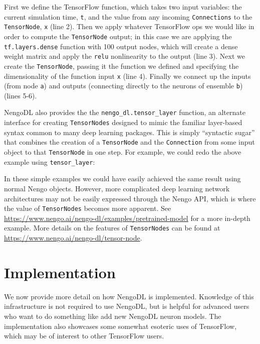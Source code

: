 \documentclass{article}
\begin{document}


First we define the TensorFlow function, which takes two input variables: the current simulation time, \texttt{t}, and the value from any incoming \texttt{Connections} to the \texttt{TensorNode}, \texttt{x} (line 2).  Then we apply whatever TensorFlow ops we would like in order to compute the \texttt{TensorNode} output; in this case we are applying the \texttt{tf.layers.dense} function with 100 output nodes, which will create a dense weight matrix and apply the \texttt{relu} nonlinearity to the output (line 3).  Next we create the \texttt{TensorNode}, passing it the function we defined and specifying the dimensionality of the function input \texttt{x} (line 4).  Finally we connect up the inputs (from node \texttt{a}) and outputs (connecting directly to the neurons of ensemble \texttt{b}) (lines 5-6).

NengoDL also provides the the \texttt{nengo\_dl.tensor\_layer} function, an alternate interface for creating \texttt{TensorNodes} designed to mimic the familiar layer-based syntax common to many deep learning packages.  This is simply ``syntactic sugar'' that combines the creation of a \texttt{TensorNode} and the \texttt{Connection} from some input object to that \texttt{TensorNode} in one step.  For example, we could redo the above example using \texttt{tensor\_layer}:



In these simple examples we could have easily achieved the same result using normal Nengo objects.  However, more complicated deep learning network architectures may not be easily expressed through the Nengo API, which is where the value of \texttt{TensorNodes} becomes more apparent.  See \url{https://www.nengo.ai/nengo-dl/examples/pretrained-model} for a more in-depth example.  More details on the features of \texttt{TensorNodes} can be found at \url{https://www.nengo.ai/nengo-dl/tensor-node}.

\section{Implementation}
\label{sec:implementation}

We now provide more detail on how NengoDL is implemented.  Knowledge of this infrastructure is not required to use NengoDL, but is helpful for advanced users who want to do something like add new NengoDL neuron models.  The implementation also showcases some somewhat esoteric uses of TensorFlow, which may be of interest to other TensorFlow users.
\end{document}
